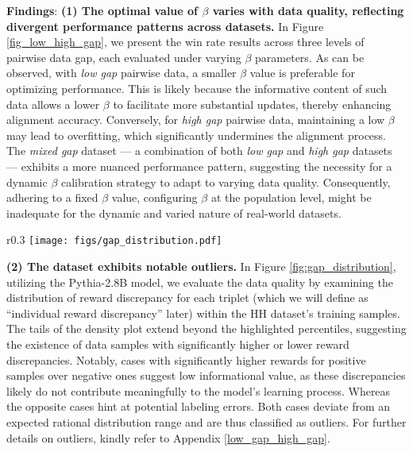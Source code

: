 \textbf{Findings}: 
\textbf{(1) The optimal value of $\beta$ varies with data quality, reflecting divergent performance patterns across datasets.}
In Figure \ref{fig_low_high_gap}, we present the win rate results across three levels of pairwise data gap, each evaluated under varying $\beta$ parameters. As can be observed,
with \emph{low gap} pairwise data, a smaller $\beta$ value is preferable for optimizing performance. This is likely because the informative content of such data allows a lower $\beta$ to facilitate more substantial updates, thereby enhancing alignment accuracy.
Conversely, for \emph{high gap} pairwise data, maintaining a low $\beta$ may lead to overfitting, which significantly undermines the alignment process.
The \emph{mixed gap} dataset --- a combination of both \emph{low gap} and \emph{high gap} datasets --- exhibits a more nuanced performance pattern, suggesting the necessity for a dynamic $\beta$ calibration strategy to adapt to varying data quality.
Consequently, adhering to a fixed $\beta$ value, \ie configuring $\beta$ at the population level, might be inadequate for the dynamic and varied nature of real-world datasets.
\begin{wrapfigure}{r}{0.3\textwidth}
    \centering
    \vspace{-0.45cm}
    \!\!\!\!\!\!\!\! \texttt{[image: figs/gap\_distribution.pdf]}
    \vspace{-0.3cm}
    \caption{The distribution of individual reward discrepancy ($r(\yb_w^{(i)};\xb^{(i)})-r(\yb_l^{(i)};\xb^{(i)})$) on the training dataset of HH.}
    \vspace{-0.5cm}
    \label{fig:gap_distribution}
  \end{wrapfigure}
\textbf{(2) The dataset exhibits notable outliers.} In Figure \ref{fig:gap_distribution}, utilizing the Pythia-2.8B model, we evaluate the data quality by examining the distribution of reward discrepancy for each triplet (which we will define as ``individual reward discrepancy'' later) within the HH dataset's training samples. 
The tails of the density plot extend beyond the highlighted percentiles, suggesting the existence of data samples with significantly higher or lower reward discrepancies.
Notably, cases with significantly higher rewards for positive samples over negative ones suggest low informational value, as these discrepancies likely do not contribute meaningfully to the model's learning process. Whereas the opposite cases hint at potential labeling errors. Both cases deviate from an expected rational distribution range and are thus classified as outliers. For further details on outliers, kindly refer to Appendix \ref{low_gap_high_gap}.

